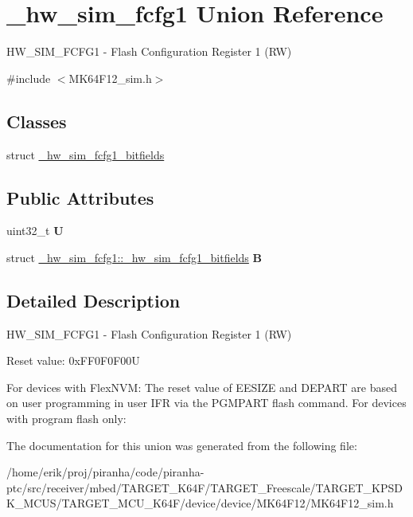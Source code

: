 \hypertarget{union__hw__sim__fcfg1}{}\section{\+\_\+hw\+\_\+sim\+\_\+fcfg1 Union Reference}
\label{union__hw__sim__fcfg1}


H\+W\+\_\+\+S\+I\+M\+\_\+\+F\+C\+F\+G1 -\/ Flash Configuration Register 1 (RW)  




{\ttfamily \#include $<$M\+K64\+F12\+\_\+sim.\+h$>$}

\subsection*{Classes}
\begin{DoxyCompactItemize}
\item 
struct \hyperlink{struct__hw__sim__fcfg1_1_1__hw__sim__fcfg1__bitfields}{\+\_\+hw\+\_\+sim\+\_\+fcfg1\+\_\+bitfields}
\end{DoxyCompactItemize}
\subsection*{Public Attributes}
\begin{DoxyCompactItemize}
\item 
uint32\+\_\+t {\bfseries U}\hypertarget{union__hw__sim__fcfg1_a2a472ac8808dae5f2ae5a1747162d4f3}{}\label{union__hw__sim__fcfg1_a2a472ac8808dae5f2ae5a1747162d4f3}

\item 
struct \hyperlink{struct__hw__sim__fcfg1_1_1__hw__sim__fcfg1__bitfields}{\+\_\+hw\+\_\+sim\+\_\+fcfg1\+::\+\_\+hw\+\_\+sim\+\_\+fcfg1\+\_\+bitfields} {\bfseries B}\hypertarget{union__hw__sim__fcfg1_a3399aa822c215c91c1feaee6a87711a4}{}\label{union__hw__sim__fcfg1_a3399aa822c215c91c1feaee6a87711a4}

\end{DoxyCompactItemize}


\subsection{Detailed Description}
H\+W\+\_\+\+S\+I\+M\+\_\+\+F\+C\+F\+G1 -\/ Flash Configuration Register 1 (RW) 

Reset value\+: 0x\+F\+F0\+F0\+F00U

For devices with Flex\+N\+VM\+: The reset value of E\+E\+S\+I\+ZE and D\+E\+P\+A\+RT are based on user programming in user I\+FR via the P\+G\+M\+P\+A\+RT flash command. For devices with program flash only\+: 

The documentation for this union was generated from the following file\+:\begin{DoxyCompactItemize}
\item 
/home/erik/proj/piranha/code/piranha-\/ptc/src/receiver/mbed/\+T\+A\+R\+G\+E\+T\+\_\+\+K64\+F/\+T\+A\+R\+G\+E\+T\+\_\+\+Freescale/\+T\+A\+R\+G\+E\+T\+\_\+\+K\+P\+S\+D\+K\+\_\+\+M\+C\+U\+S/\+T\+A\+R\+G\+E\+T\+\_\+\+M\+C\+U\+\_\+\+K64\+F/device/device/\+M\+K64\+F12/M\+K64\+F12\+\_\+sim.\+h\end{DoxyCompactItemize}
